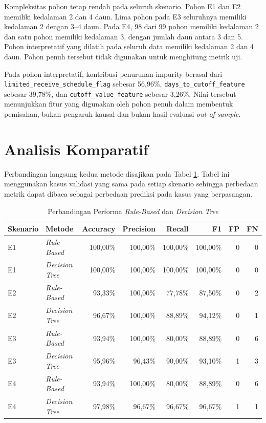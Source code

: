 Kompleksitas pohon tetap rendah pada seluruh skenario. Pohon E1 dan E2 memiliki kedalaman 2 dan 4 daun. Lima pohon pada E3 seluruhnya memiliki kedalaman 2 dengan 3--4 daun. Pada E4, 98 dari 99 pohon memiliki kedalaman 2 dan satu pohon memiliki kedalaman 3, dengan jumlah daun antara 3 dan 5. Pohon interpretatif yang dilatih pada seluruh data memiliki kedalaman 2 dan 4 daun. Pohon penuh tersebut tidak digunakan untuk menghitung metrik uji.

Pada pohon interpretatif, kontribusi penurunan impurity berasal dari \texttt{limited\_receive\_schedule\_flag} sebesar 56,96\%, \texttt{days\_to\_cutoff\_feature} sebesar 39,78\%, dan \texttt{cutoff\_value\_feature} sebesar 3,26\%. Nilai tersebut menunjukkan fitur yang digunakan oleh pohon penuh dalam membentuk pemisahan, bukan pengaruh kausal dan bukan hasil evaluasi \textit{out-of-sample}.

\FloatBarrier

\section{Analisis Komparatif}

Perbandingan langsung kedua metode disajikan pada Tabel \ref{tab:perbandingan-performa-bab-empat}. Tabel ini menggunakan kasus validasi yang sama pada setiap skenario sehingga perbedaan metrik dapat dibaca sebagai perbedaan prediksi pada kasus yang berpasangan.

\begin{table}[htbp]
    \centering
    \caption{Perbandingan Performa \textit{Rule-Based} dan \textit{Decision Tree}}
    \label{tab:perbandingan-performa-bab-empat}
    \scriptsize
    \setlength{\tabcolsep}{3pt}
    \renewcommand{\arraystretch}{1.2}
    \begin{tabular}{llrrrrrr}
        \toprule
        \textbf{Skenario} & \textbf{Metode} & \textbf{Accuracy} & \textbf{Precision} & \textbf{Recall} & \textbf{F1} & \textbf{FP} & \textbf{FN} \\
        \midrule
        E1 & \textit{Rule-Based} & 100,00\% & 100,00\% & 100,00\% & 100,00\% & 0 & 0 \\
        E1 & \textit{Decision Tree} & 100,00\% & 100,00\% & 100,00\% & 100,00\% & 0 & 0 \\
        E2 & \textit{Rule-Based} & 93,33\% & 100,00\% & 77,78\% & 87,50\% & 0 & 2 \\
        E2 & \textit{Decision Tree} & 96,67\% & 100,00\% & 88,89\% & 94,12\% & 0 & 1 \\
        E3 & \textit{Rule-Based} & 93,94\% & 100,00\% & 80,00\% & 88,89\% & 0 & 6 \\
        E3 & \textit{Decision Tree} & 95,96\% & 96,43\% & 90,00\% & 93,10\% & 1 & 3 \\
        E4 & \textit{Rule-Based} & 93,94\% & 100,00\% & 80,00\% & 88,89\% & 0 & 6 \\
        E4 & \textit{Decision Tree} & 97,98\% & 96,67\% & 96,67\% & 96,67\% & 1 & 1 \\
        \bottomrule
    \end{tabular}
\end{table}

